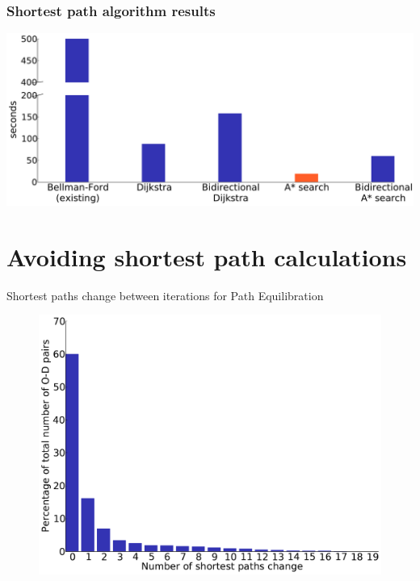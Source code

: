 \documentclass{beamer}
\begin{document}
\begin{frame}
    \frametitle{Shortest path algorithm results}
    \begin{center}
        \includegraphics[width=\textwidth, keepaspectratio]{img/runtime}
    \end{center}
\end{frame}

\section{Avoiding shortest path calculations}
\begin{frame}{Shortest paths change between iterations for Path Equilibration}
    \begin{figure}
        \centering
        \includegraphics[width=.75\textwidth, keepaspectratio]{img/sp_change}
    \end{figure}
\end{frame}
\end{document}
